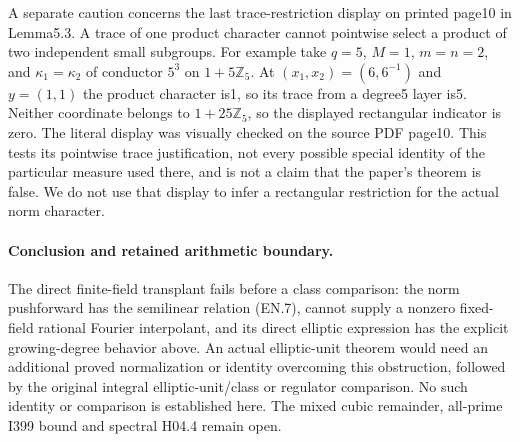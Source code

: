 A separate caution concerns the last trace-restriction display on
printed page10 in Lemma5.3.  A trace of one product character cannot
pointwise select a product of two independent small subgroups.
For example take $q=5$, $M=1$, $m=n=2$, and
$\kappa_1=\kappa_2$ of conductor $5^3$ on $1+5\mathbb Z_5$.
At $(x_1,x_2)=(6,6^{-1})$ and $y=(1,1)$ the product character is1,
so its trace from a degree5 layer is5.  Neither coordinate belongs
to $1+25\mathbb Z_5$, so the displayed rectangular indicator is zero.
The literal display was visually checked on the source PDF page10.
This tests its pointwise trace justification, not every possible
special identity of the particular measure used there, and is not a
claim that the paper's theorem is false.  We do not use that display
to infer a rectangular restriction for the actual norm character.

\paragraph{Conclusion and retained arithmetic boundary.}
The direct finite-field transplant fails before a class comparison:
the norm pushforward has the semilinear relation (EN.7), cannot supply
a nonzero fixed-field rational Fourier interpolant, and its direct
elliptic expression has the explicit growing-degree behavior above.
An actual elliptic-unit theorem would need an additional proved
normalization or identity overcoming this obstruction, followed by
the original integral elliptic-unit/class or regulator comparison.
No such identity or comparison is established here.  The mixed cubic
remainder, all-prime I399 bound and spectral H04.4 remain open.
